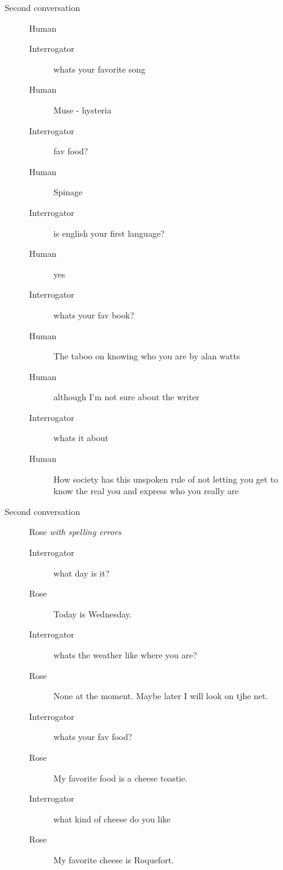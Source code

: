 \begin{itemize}
\begin{description}
\begin{description}
            \end{description}
         \item [Second conversation] Human
            \begin{description}
               \item [Interrogator] whats your favorite song
               \item [Human] Muse - hysteria
               \item [Interrogator] fav food?
               \item [Human] Spinage
               \item [Interrogator] is english your first language?
               \item [Human] yes
               \item [Interrogator] whats your fav book?\
               \item [Human] The taboo on knowing who you are by alan watts
               \item [Human] although I'm not sure about the writer
               \item [Interrogator] whats it about
               \item [Human] How society has this unspoken rule of not letting you get to know the real you and express who you really are
            \end{description}
         \item [Second conversation] Rose \textit{with spelling errors}
            \begin{description}
               \item [Interrogator] what day is it?
               \item [Rose] Today is Wednesday.
               \item [Interrogator] whats the weather like where you are?\
               \item [Rose] None at the moment. Maybe later I will look on tjhe net.
               \item [Interrogator] whats your fav food?
               \item [Rose] My favorite food is a cheese toastie.
               \item [Interrogator] what kind of cheese do you like\
               \item [Rose] My favorite cheese is Roquefort.
            \end{description}
      \end{description}


\end{itemize}
